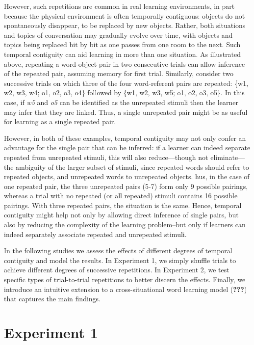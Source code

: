 \documentclass[man,floatsintext]{apa6}
\begin{document}
However, such repetitions are common in real learning environments, in part because the physical environment is often temporally contiguous: objects do not spontaneously disappear, to be replaced by new objects.
Rather, both situations and topics of conversation may gradually evolve over time, with objects and topics being replaced bit by bit as one passes from one room to the next.
Such temporal contiguity can aid learning in more than one situation.
As illustrated above, repeating a word-object pair in two consecutive trials can allow inference of the repeated pair, assuming memory for first trial.
Similarly, consider two successive trials on which three of the four word-referent pairs are repeated: \{w1, w2, w3, w4; o1, o2, o3, o4\} followed by \{w1, w2, w3, w5; o1, o2, o3, o5\}.
In this case, if \emph{w5} and \emph{o5} can be identified as the unrepeated stimuli then the learner may infer that they are linked.
Thus, a single unrepeated pair might be as useful for learning as a single repeated pair.

However, in both of these examples, temporal contiguity may not only confer an advantage for the single pair that can be inferred: if a learner can indeed separate repeated from unrepeated stimuli, this will also reduce---though not eliminate---the ambiguity of the larger subset of stimuli, since repeated words should refer to repeated objects, and unrepeated words to unrepeated objects.
hus, in the case of one repeated pair, the three unrepeated pairs (5-7) form only 9 possible pairings, whereas a trial with no repeated (or all repeated) stimuli contains 16 possible pairings.
With three repeated pairs, the situation is the same.
Hence, temporal contiguity might help not only by allowing direct inference of single pairs, but also by reducing the complexity of the learning problem--but only if learners can indeed separately associate repeated and unrepeated stimuli.

In the following studies we assess the effects of different degrees of temporal contiguity and model the results. In Experiment 1, we simply shuffle trials to achieve different degrees of successive repetitions.
In Experiment 2, we test specific types of trial-to-trial repetitions to better discern the effects.
Finally, we introduce an intuitive extension to a cross-situational word learning model ({\textbf{???}}) that captures the main findings.

\hypertarget{experiment-1}{%
\section{Experiment 1}\label{experiment-1}}
\end{document}
